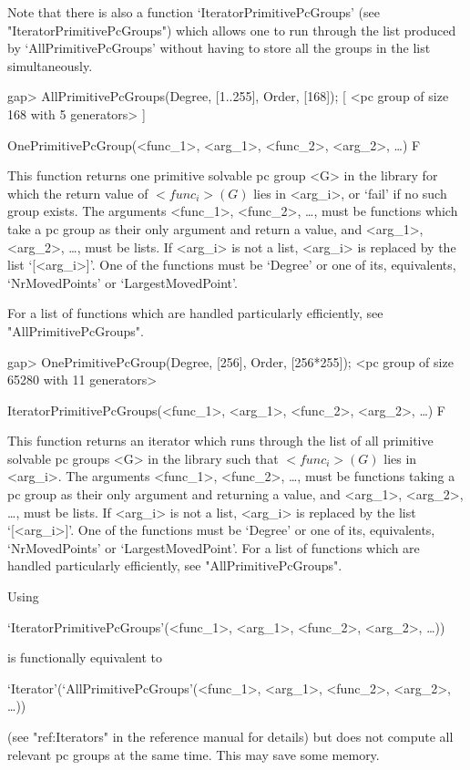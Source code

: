 Note that there is also a function `IteratorPrimitivePcGroups' (see
"IteratorPrimitivePcGroups") which allows one to run through the list produced by
`AllPrimitivePcGroups' without having to store all the groups in the list
simultaneously.

\beginexample
gap> AllPrimitivePcGroups(Degree, [1..255], Order, [168]);
[ <pc group of size 168 with 5 generators> ]
\endexample


\>OnePrimitivePcGroup(<func_1>, <arg_1>, <func_2>, <arg_2>, \dots) F

This function returns one primitive solvable pc
group <G> in the  {\IRREDSOL} library for which the return value of $<func_i>(G)$ lies in
<arg_i>, or `fail' if no such group exists.  The arguments <func_1>, <func_2>, \dots,
must be {\GAP} functions which take a pc group as their only argument and return a
value, and <arg_1>, <arg_2>,
\dots,  must be lists. If <arg_i> is not a list, <arg_i> is replaced by the list
`[<arg_i>]'. One of the functions must be `Degree' or one of its, equivalents, `NrMovedPoints' or `LargestMovedPoint'.

For a list of functions which are handled particularly efficiently, see
"AllPrimitivePcGroups".

\beginexample
gap> OnePrimitivePcGroup(Degree, [256], Order, [256*255]);
<pc group of size 65280 with 11 generators>
\endexample

\>IteratorPrimitivePcGroups(<func_1>, <arg_1>, <func_2>, <arg_2>, \dots) F

This function returns an iterator which runs through the list of all primitive solvable
pc groups <G> in the  {\IRREDSOL} library such that
$<func_i>(G)$ lies in <arg_i>. The arguments <func_1>, <func_2>, \dots,
must be {\GAP} functions taking a pc group as their only argument and returning 
a value, and <arg_1>, <arg_2>, \dots, 
must be lists. If <arg_i> is not a list, <arg_i> is replaced by the list `[<arg_i>]'.
One of the functions must be `Degree' or one of its, equivalents, `NrMovedPoints' 
or `LargestMovedPoint'.
For a list of functions which are handled particularly efficiently, see
"AllPrimitivePcGroups".

Using 

`IteratorPrimitivePcGroups'(<func_1>, <arg_1>, <func_2>, <arg_2>, \dots)) 

is functionally equivalent to 

`Iterator'(`AllPrimitivePcGroups'(<func_1>, <arg_1>, <func_2>, <arg_2>, \dots))

(see "ref:Iterators" in the {\GAP} reference manual for details) but does not 
compute all relevant pc groups at the same time. 
This may save some memory. 


